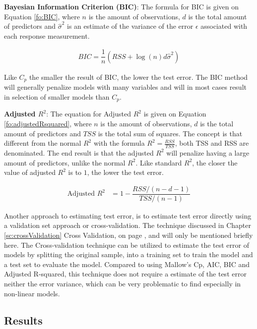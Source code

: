 \textbf{Bayesian Information Criterion (BIC)}: The formula for BIC is given on Equation \ref{fo:BIC}, where $n$ is the amount of observations, $d$ is the total amount of predictors and $\hat{\sigma}^2$ is an estimate of the variance of the error $\epsilon$ associated with each response measurement.

\begin{align}\label{fo:BIC}
BIC = \dfrac{1}{n} (RSS + \log(n) d \hat{\sigma}^2)
\end{align}

Like $C_p$ the smaller the result of BIC, the lower the test error. The BIC method will generally penalize models with many variables and will in most cases result in selection of smaller models than $C_p$.

\textbf{Adjusted $R^2$}: The equation for Adjusted $R^2$ is given on Equation \ref{fo:adjustedRsquared}, where $n$ is the amount of observations, $d$ is the total amount of predictors and $TSS$ is the total sum of squares. The concept is that different from the normal $R^2$ with the formula $R^2 = \tfrac{RSS}{TSS}$, both TSS and RSS  are denominated. The end result is that the adjusted $R^2$ will penalize having a large amount of predictors, unlike the normal $R^2$. Like standard $R^2$, the closer the value of adjusted $R^2$ is to $1$, the lower the test error.

\begin{align}\label{fo:adjustedRsquared}
	\text{Adjusted } R^2 &= 1 - \dfrac{RSS/(n-d-1)}{TSS/(n-1)}
\end{align}

Another approach to estimating test error, is to estimate test error directly using a validation set approach or cross-validation. The technique discussed in Chapter \ref{sc:crossValidation} Cross Validation, on page \pageref{sc:crossValidation}, and will only be mentioned briefly here. The Cross-validation technique can be utilized to estimate the test error of models by splitting the original sample, into a training set to train the model and a test set to evaluate the model. Compared to using Mallow's Cp, AIC, BIC and Adjusted R-squared, this technique does not require a estimate of the test error neither the error variance, which can be very problematic to find especially in non-linear models.

\subsection{Results}

